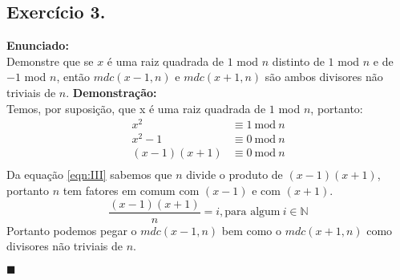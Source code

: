 \documentclass[12pt]{article}
\newcommand{\bb}[1]{\mathbb{#1}}
\newcommand{\N}{\bb{N}}
\newcommand{\newqed}{{\hfill\color{black}\ensuremath{\blacksquare}}}
\begin{document}
\subsection*{Exercício 3.}
	\textbf{Enunciado:}\\
	Demonstre que se $x$ é uma raiz quadrada de $1$ mod $n$ distinto de
	$1$ mod $n$ e de $-1$ mod $n$, então $mdc(x-1, n)$ e $mdc(x+1, n)$
	são ambos divisores não triviais de $n$.
	\newline
	\newline
	\textbf{Demonstração:}\\
	Temos, por suposição, que x é uma raiz quadrada de $1$ mod $n$, portanto:
	\begin{align*}
			x^2 &\equiv 1 \ \mathrm{mod} \ n\\
			x^2 - 1 &\equiv 0 \ \mathrm{mod} \ n\\
			\label{eqn:III}\tag{I}
				(x - 1)(x + 1) &\equiv 0 \ \mathrm{mod} \ n\\
	\end{align*}
	Da equação \eqref{eqn:III} sabemos que $n$ divide o produto de $(x-1)(x+1)$,
	portanto $n$ tem fatores em comum com $(x-1)$ e com $(x+1)$.\\
	$$\frac{(x-1)(x+1)}{n} = i,   \text{para algum} \  i \in \N$$
	Portanto podemos pegar o $mdc(x-1, n)$ bem como o $mdc(x+1, n)$ como 
	divisores  não triviais de $n$.
	
	\newqed
	
\end{document}
